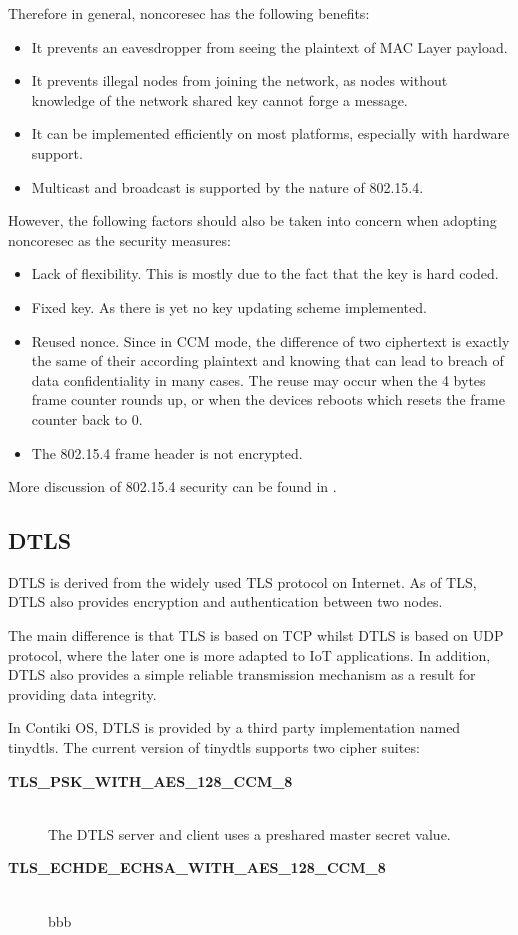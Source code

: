 Therefore in general, noncoresec has the following benefits:
\begin{itemize}
\item It prevents an eavesdropper from seeing the plaintext of MAC Layer payload.
\item It prevents illegal nodes from joining the network, as nodes without knowledge of the network shared key cannot forge a message.
\item It can be implemented efficiently on most platforms, especially with hardware support.
\item Multicast and broadcast is supported by the nature of 802.15.4.
\end{itemize}

However, the following factors should also be taken into concern when adopting noncoresec as the security measures:
\begin{itemize}
\item Lack of flexibility. This is mostly due to the fact that the key is hard coded.
\item Fixed key. As there is yet no key updating scheme implemented. 
\item Reused nonce. Since in CCM mode, the difference of two ciphertext is exactly the same of their according plaintext and knowing that can lead to breach of data confidentiality in many cases. The reuse may occur when the 4 bytes frame counter rounds up, or when the devices reboots which resets the frame counter back to $0$.
\item The 802.15.4 frame header is not encrypted.
\end{itemize}

More discussion of 802.15.4 security can be found in \cite{802154sec}.

\subsection{DTLS}
DTLS is derived from the widely used TLS protocol on Internet. As of TLS, DTLS also provides encryption and authentication between two nodes. 

The main difference is that TLS is based on TCP whilst DTLS is based on UDP protocol, where the later one is more adapted to IoT applications. In addition, DTLS also provides a simple reliable transmission mechanism as a result for providing data integrity.

In Contiki OS, DTLS is provided by a third party implementation named tinydtls\cite{tinydtls}. The current version of tinydtls supports two cipher suites:
\begin{description}
\item[\textbf{TLS\_PSK\_WITH\_AES\_128\_CCM\_8}] \hfill \\
The DTLS server and client uses a preshared master secret value. 
\item[\textbf{TLS\_ECHDE\_ECHSA\_WITH\_AES\_128\_CCM\_8}] \hfill \\
bbb
\end{description}

